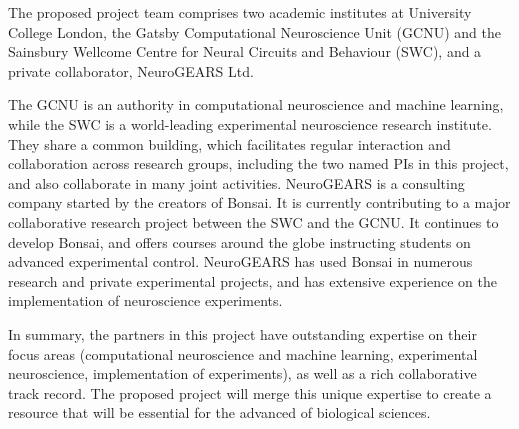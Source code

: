 The proposed project team comprises two academic
institutes at University College London, the Gatsby Computational Neuroscience Unit (GCNU) and the Sainsbury
Wellcome Centre for Neural Circuits and Behaviour (SWC), and a private
collaborator, NeuroGEARS Ltd.

The GCNU is an authority in computational neuroscience and
machine learning, while the SWC is a world-leading experimental
neuroscience research institute. They share a common building, which facilitates regular interaction and collaboration across research groups, including the two named PIs in this project, and also collaborate in many joint activities.
%
NeuroGEARS is a consulting company started by the creators of Bonsai. It is currently contributing to a major
collaborative research project between the SWC and the GCNU. It continues to develop Bonsai,
and offers courses around the globe instructing students on advanced experimental control.
NeuroGEARS has used Bonsai in numerous research and private experimental projects,
and has extensive experience on the implementation of neuroscience experiments.

In summary, the partners in this project have outstanding expertise on their focus areas (computational neuroscience and machine learning, experimental
neuroscience, implementation of experiments), as well as a rich collaborative
track record. The proposed project will merge this unique expertise to create a
resource that will be essential for the advanced of biological sciences.
